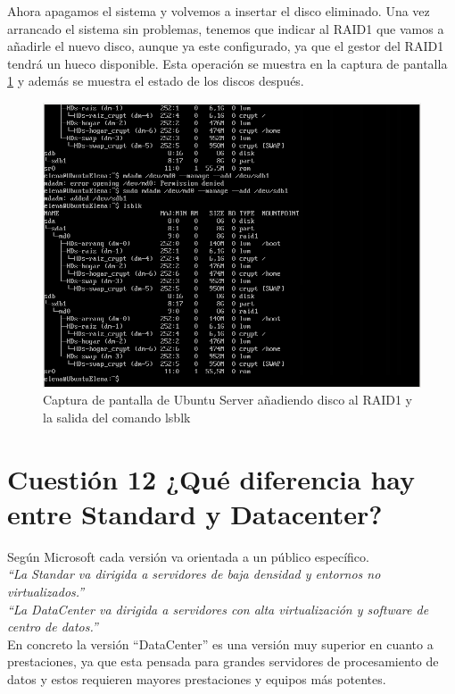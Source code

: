 Ahora apagamos el sistema y volvemos a insertar el disco eliminado. Una vez arrancado el sistema sin problemas, tenemos que indicar al RAID1
que vamos a añadirle el nuevo disco, aunque ya este configurado, ya que el gestor del RAID1 tendrá un hueco disponible.
Esta operación se muestra en la captura de pantalla \ref{fig:figura3} y además se muestra el estado de los discos después.
\begin{figure}[H] %
\centering
\includegraphics[scale=0.4]{img/ubuntuAnadidodenuevodiscoraid.png} 
\caption{Captura de pantalla de Ubuntu Server añadiendo disco al RAID1 y la salida del comando lsblk} \label{fig:figura3}
\end{figure}



\section{Cuestión 12 ¿Qué diferencia hay entre Standard y Datacenter?}
Según Microsoft \cite{Standar_DataCenter} \cite{Standar_DataCenter1}  cada versión va orientada a un público específico.\\
\textit{``La Standar va dirigida a servidores de baja densidad y entornos no virtualizados.''} \\
\textit{``La DataCenter va dirigida a servidores con alta virtualización y software de centro de datos.''}\\
En concreto la versión ``DataCenter'' es una versión muy superior en cuanto a prestaciones, ya que esta pensada para grandes servidores
de procesamiento de datos y estos requieren mayores prestaciones y equipos más potentes.




